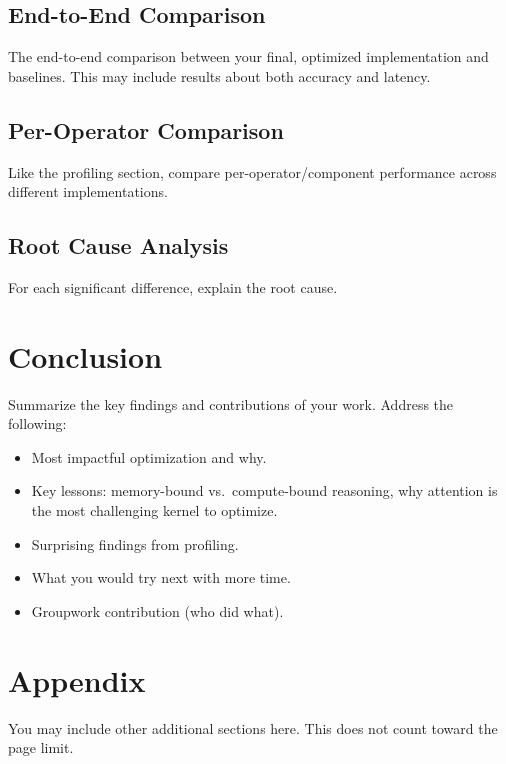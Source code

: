 \documentclass{article} %
\begin{document}
\subsection{End-to-End Comparison}

The end-to-end comparison between your final, optimized implementation and
baselines. This may include results about both accuracy and latency. 


\subsection{Per-Operator Comparison}

Like the profiling section, compare per-operator/component performance across
different implementations. 


\subsection{Root Cause Analysis}

For each significant difference, explain the root cause.

\section{Conclusion}\label{sec:conclusion}

Summarize the key findings and contributions of your work. Address the following:
\begin{itemize}
    \item Most impactful optimization and why.
    \item Key lessons: memory-bound vs.\ compute-bound reasoning, why attention is the most challenging kernel to optimize.
    \item Surprising findings from profiling.
    \item What you would try next with more time.
    \item Groupwork contribution (who did what).
\end{itemize}


\clearpage



\appendix
\section{Appendix}
You may include other additional sections here. This does not count toward the
page limit. 
\end{document}
